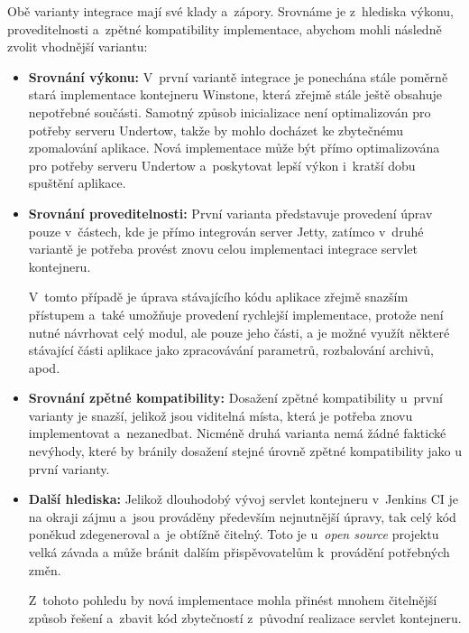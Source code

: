             \noindent Obě varianty integrace mají své klady a~zápory. 
            Srovnáme je z~hlediska výkonu, proveditelnosti a~zpětné kompatibility
            implementace, abychom mohli následně zvolit vhodnější variantu:

            \begin{itemize}
                \item{\textbf{Srovnání výkonu:} V~první variantě integrace je ponechána stále
                 poměrně stará implementace kontejneru Winstone, která zřejmě stále ještě
                 obsahuje nepotřebné součásti. Samotný způsob inicializace není optimalizován
                 pro potřeby serveru Undertow, takže by mohlo docházet ke zbytečnému
                 zpomalování aplikace.
                 Nová implementace může být přímo optimalizována pro potřeby 
                 serveru Undertow a~poskytovat lepší výkon i~kratší dobu spuštění aplikace.}

                \item{\textbf{Srovnání proveditelnosti:} První varianta představuje provedení 
                    úprav pouze v~částech, kde je přímo integrován server Jetty, 
                    zatímco v~druhé variantě je potřeba provést znovu celou implementaci
                    integrace servlet kontejneru. 
                                         
                    V~tomto případě je úprava stávajícího kódu aplikace
                    zřejmě snazším přístupem a~také umožňuje provedení rychlejší
                    implementace, protože není nutné návrhovat celý modul,
                    ale pouze jeho části, a je možné využít některé stávající části aplikace
                    jako zpracovávání parametrů, rozbalování archivů, apod.}

                \item{\textbf{Srovnání zpětné kompatibility:} Dosažení zpětné kompatibility
                    u~první varianty je snazší, jelikož jsou viditelná místa, která je 
                    potřeba znovu implementovat a~nezanedbat. Nicméně druhá varianta
                    nemá žádné faktické nevýhody, které by bránily dosažení 
                    stejné úrovně zpětné kompatibility jako u první varianty.}

                \item{\textbf{Další hlediska:} Jelikož dlouhodobý vývoj servlet kontejneru
                    v~Jenkins CI je na okraji zájmu a~jsou prováděny především nejnutnější úpravy, 
                    tak celý kód poněkud zdegeneroval a~je obtížně čitelný. Toto
                    je u~\emph{open source} projektu velká závada 
                    a může bránit dalším přispěvovatelům k~provádění potřebných změn.

                    Z~tohoto pohledu by nová implementace mohla přinést mnohem čitelnější
                    způsob řešení a~zbavit kód zbytečností z~původní realizace servlet kontejneru.}
            \end{itemize}



